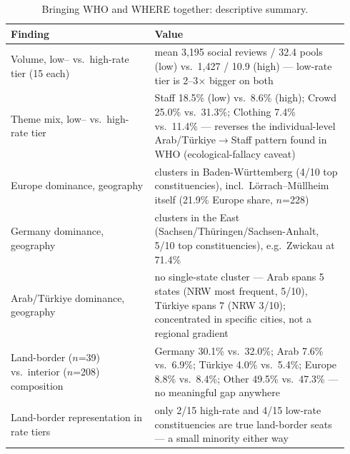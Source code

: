 \begin{table}[htbp]
\centering
\footnotesize
\setlength{\tabcolsep}{4pt}
\caption{Bringing WHO and WHERE together: descriptive summary.}
\label{tab:bringing-together-summary}
\begin{tabular}{@{} p{0.4\linewidth} p{0.54\linewidth} @{}}
\toprule
Finding & Value \\
\midrule
Volume, low-- vs.\ high-rate tier (15 each) & mean 3{,}195 social reviews / 32.4 pools (low) vs.\ 1{,}427 / 10.9 (high) --- low-rate tier is 2--3$\times$ bigger on both \\
Theme mix, low-- vs.\ high-rate tier & Staff 18.5\% (low) vs.\ 8.6\% (high); Crowd 25.0\% vs.\ 31.3\%; Clothing 7.4\% vs.\ 11.4\% --- reverses the individual-level Arab/T\"urkiye$\to$Staff pattern found in WHO (ecological-fallacy caveat) \\
Europe dominance, geography & clusters in Baden-W\"urttemberg (4/10 top constituencies), incl.\ L\"orrach--M\"ullheim itself (21.9\% Europe share, $n$=228) \\
Germany dominance, geography & clusters in the East (Sachsen/Th\"uringen/Sachsen-Anhalt, 5/10 top constituencies), e.g.\ Zwickau at 71.4\% \\
Arab/T\"urkiye dominance, geography & no single-state cluster --- Arab spans 5 states (NRW most frequent, 5/10), T\"urkiye spans 7 (NRW 3/10); concentrated in specific cities, not a regional gradient \\
Land-border ($n$=39) vs.\ interior ($n$=208) composition & Germany 30.1\% vs.\ 32.0\%; Arab 7.6\% vs.\ 6.9\%; T\"urkiye 4.0\% vs.\ 5.4\%; Europe 8.8\% vs.\ 8.4\%; Other 49.5\% vs.\ 47.3\% --- no meaningful gap anywhere \\
Land-border representation in rate tiers & only 2/15 high-rate and 4/15 low-rate constituencies are true land-border seats --- a small minority either way \\
\bottomrule
\end{tabular}
\end{table}
